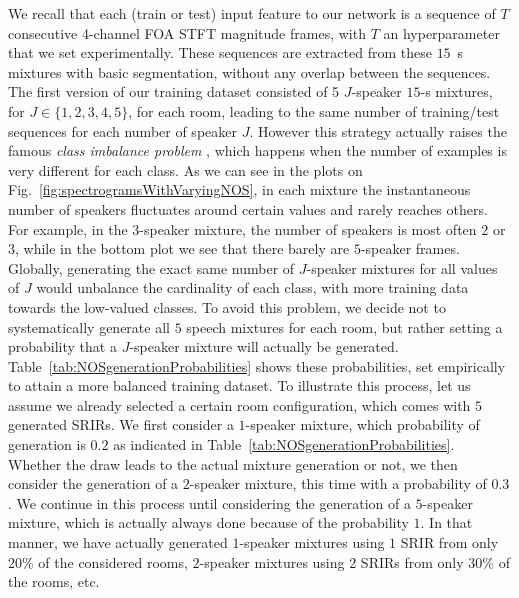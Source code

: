 We recall that each (train or test) input feature to our network is a sequence of $T$ consecutive 4-channel FOA STFT magnitude frames, with $T$ an hyperparameter that we set experimentally. These sequences are extracted from these $15$~s mixtures with basic segmentation, without any overlap between the sequences.
The first version of our training dataset consisted of 5 $J$-speaker $15$-s mixtures, for $J \in \{1,2,3,4,5\}$, for each room, leading to the same number of training/test sequences for each number of speaker $J$. However this strategy actually raises the famous \textit{class imbalance problem} \cite{buda_systematic_2018}, which happens when the number of examples is very different for each class. As we can see in the plots on Fig.~\ref{fig:spectrogramsWithVaryingNOS}, in each mixture the instantaneous number of speakers fluctuates around certain values and rarely reaches others. For example, in the $3$-speaker mixture, the number of speakers is most often $2$ or $3$, while in the bottom plot we see that there barely are $5$-speaker frames. Globally, generating the exact same number of $J$-speaker mixtures for all values of $J$ would unbalance the cardinality of each class, with more training data towards the low-valued classes. To avoid this problem, we decide not to systematically generate all $5$ speech mixtures for each room, but rather setting a probability that a $J$-speaker mixture will actually be generated. Table~\ref{tab:NOSgenerationProbabilities} shows these probabilities, set empirically to attain a more balanced training dataset. To illustrate this process, let us assume we already selected a certain room configuration, which comes with $5$ generated SRIRs. We first consider a $1$-speaker mixture, which probability of generation is $0.2$ as indicated in Table~\ref{tab:NOSgenerationProbabilities}. Whether the draw leads to the actual mixture generation or not, we then consider the generation of a $2$-speaker mixture, this time with a probability of $0.3$. We continue in this process until considering the generation of a $5$-speaker mixture, which is actually always done because of the probability $1$. In that manner, we have actually generated $1$-speaker mixtures using $1$ SRIR from only $20$\% of the considered rooms, $2$-speaker mixtures using $2$ SRIRs from only $30$\% of the rooms, etc.


